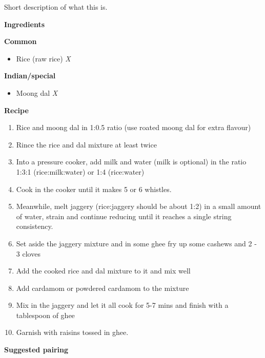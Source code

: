 Short description of what this is.

\large{\textbf{Ingredients}}
\begin{multicols}{2}
  \large{\textbf{Common}}
  \begin{itemize}
    \item Rice (raw rice) \hfill \textit{X}
  \end{itemize}
  \columnbreak
  \large{\textbf{Indian/special}}
  \begin{itemize}
    \item Moong dal \hfill \textit{X}
  \end{itemize}
\end{multicols}

\large{\textbf{Recipe}}

\begin{enumerate}
  \item Rice and moong dal in 1:0.5 ratio (use roated moong dal for extra flavour)
  \item Rince the rice and dal mixture at least twice
  \item Into a pressure cooker, add milk and water (milk is optional) in the ratio 1:3:1 (rice:milk:water) or 1:4 (rice:water)
  \item Cook in the cooker until it makes 5 or 6 whistles.
  \item Meanwhile, melt jaggery (rice:jaggery should be about 1:2) in a small amount of water, strain and continue reducing until it reaches a single string consistency.
  \item Set aside the jaggery mixture and in some ghee fry up some cashews and 2 - 3 cloves
  \item Add the cooked rice and dal mixture to it and mix well
  \item Add cardamom or powdered cardamom to the mixture
  \item Mix in the jaggery and let it all cook for 5-7 mins and finish with a tablespoon of ghee
  \item Garnish with raisins tossed in ghee.
\end{enumerate}

\large{\textbf{Suggested pairing}}
